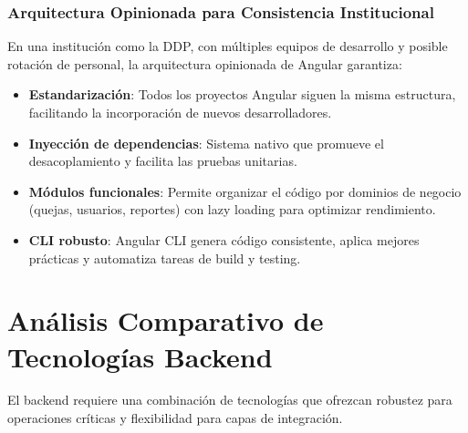 \subsubsection{Arquitectura Opinionada para Consistencia Institucional}

En una institución como la DDP, con múltiples equipos de desarrollo y posible rotación de personal, la arquitectura opinionada de Angular garantiza:

\begin{itemize}
    \item \textbf{Estandarización}: Todos los proyectos Angular siguen la misma estructura, facilitando la incorporación de nuevos desarrolladores.
    \item \textbf{Inyección de dependencias}: Sistema nativo que promueve el desacoplamiento y facilita las pruebas unitarias.
    \item \textbf{Módulos funcionales}: Permite organizar el código por dominios de negocio (quejas, usuarios, reportes) con lazy loading para optimizar rendimiento.
    \item \textbf{CLI robusto}: Angular CLI genera código consistente, aplica mejores prácticas y automatiza tareas de build y testing.
\end{itemize}

\section{Análisis Comparativo de Tecnologías Backend}

El backend requiere una combinación de tecnologías que ofrezcan robustez para operaciones críticas y flexibilidad para capas de integración.

